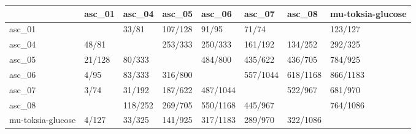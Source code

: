 \begin{tabular}{llllllll}
\toprule
{} &  asc\_01 &   asc\_04 &   asc\_05 &    asc\_06 &    asc\_07 &    asc\_08 & mu-toksia-glucose \\
\midrule
asc\_01            &         &    33/81 &  107/128 &     91/95 &     71/74 &           &           123/127 \\
asc\_04            &   48/81 &          &  253/333 &   250/333 &   161/192 &   134/252 &           292/325 \\
asc\_05            &  21/128 &   80/333 &          &   484/800 &   435/622 &   436/705 &           784/925 \\
asc\_06            &    4/95 &   83/333 &  316/800 &           &  557/1044 &  618/1168 &          866/1183 \\
asc\_07            &    3/74 &   31/192 &  187/622 &  487/1044 &           &   522/967 &           681/970 \\
asc\_08            &         &  118/252 &  269/705 &  550/1168 &   445/967 &           &          764/1086 \\
mu-toksia-glucose &   4/127 &   33/325 &  141/925 &  317/1183 &   289/970 &  322/1086 &                   \\
\bottomrule
\end{tabular}
